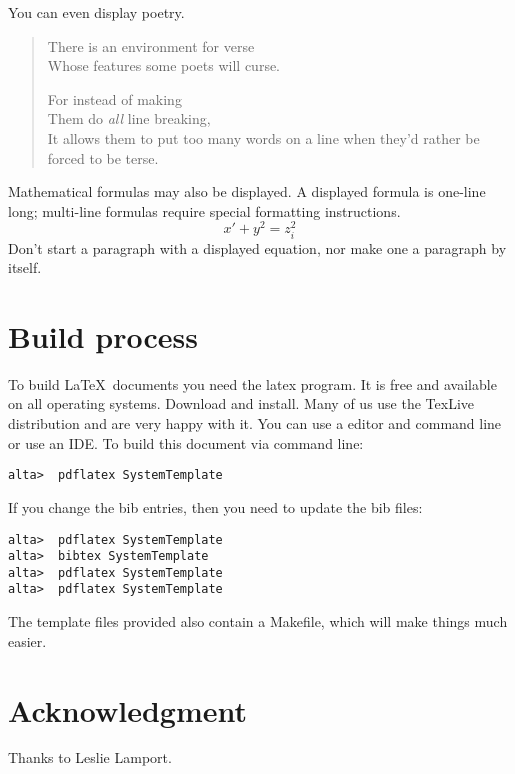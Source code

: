 You can even display poetry.
\begin{verse}
   There is an environment for verse \\    %
   Whose features some poets will curse.   %


   For instead of making\\
   Them do {\em all\/} line breaking, \\
   It allows them to put too many words on a line when they'd 
   rather be forced to be terse.
\end{verse}

Mathematical formulas may also be displayed.  A displayed formula is
one-line long; multi-line formulas require special formatting
instructions.
   \[  x' + y^{2} = z_{i}^{2}\]
Don't start a paragraph with a displayed equation, nor make
one a paragraph by itself.

\section{Build process}

To build \LaTeX\ documents you need the latex program.  It is free and available on all operating systems.   Download and install.  Many of us use the TexLive distribution and are very happy with it.    You can use a editor and command line or use an IDE.  To build this document via command line:

\begin{verbatim}
alta>  pdflatex SystemTemplate
\end{verbatim}
If you change the bib entries, then you need to update the bib files:
\begin{verbatim}
alta>  pdflatex SystemTemplate
alta>  bibtex SystemTemplate
alta>  pdflatex SystemTemplate
alta>  pdflatex SystemTemplate
\end{verbatim}

The template files provided also contain a Makefile, which will
make things much easier.  

\section*{Acknowledgment}
Thanks to Leslie Lamport.  



